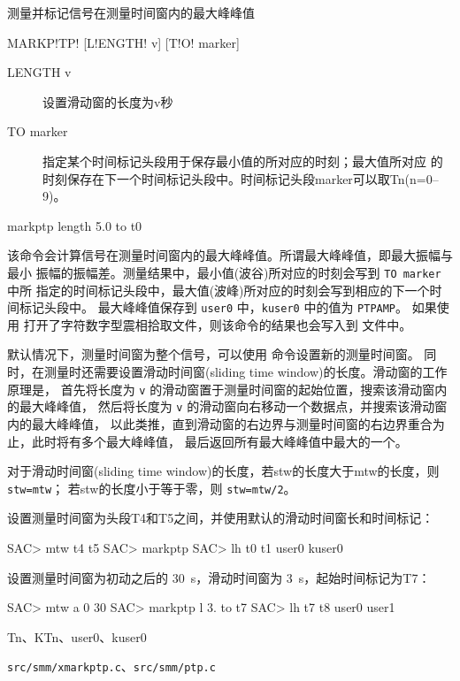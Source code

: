 \label{cmd:markptp}

测量并标记信号在测量时间窗内的最大峰峰值

\begin{SACSTX}
MARKP!TP! [L!ENGTH! v] [T!O! marker]
\end{SACSTX}

\begin{description}
\item [LENGTH v] 设置滑动窗的长度为v秒
\item [TO marker] 指定某个时间标记头段用于保存最小值的所对应的时刻；最大值所对应
    的时刻保存在下一个时间标记头段中。时间标记头段marker可以取Tn(n=0--9)。
\end{description}

\begin{SACDFT}
markptp length 5.0 to t0
\end{SACDFT}

该命令会计算信号在测量时间窗内的最大峰峰值。所谓最大峰峰值，即最大振幅与最小
振幅的振幅差。测量结果中，最小值(波谷)所对应的时刻会写到 \texttt{TO marker} 中所
指定的时间标记头段中，最大值(波峰)所对应的时刻会写到相应的下一个时间标记头段中。
最大峰峰值保存到 \texttt{user0} 中，\texttt{kuser0} 中的值为 \texttt{PTPAMP}。
如果使用  打开了字符数字型震相拾取文件，则该命令的结果也会写入到
文件中。

默认情况下，测量时间窗为整个信号，可以使用  命令设置新的测量时间窗。
同时，在测量时还需要设置滑动时间窗(sliding time window)的长度。滑动窗的工作原理是，
首先将长度为 \texttt{v} 的滑动窗置于测量时间窗的起始位置，搜索该滑动窗内的最大峰峰值，
然后将长度为 \texttt{v} 的滑动窗向右移动一个数据点，并搜索该滑动窗内的最大峰峰值，
以此类推，直到滑动窗的右边界与测量时间窗的右边界重合为止，此时将有多个最大峰峰值，
最后返回所有最大峰峰值中最大的一个。

对于滑动时间窗(sliding time window)的长度，若stw的长度大于mtw的长度，则 \texttt{stw=mtw}；
若stw的长度小于等于零，则 \texttt{stw=mtw/2}。

设置测量时间窗为头段T4和T5之间，并使用默认的滑动时间窗长和时间标记：
\begin{SACCode}
SAC> mtw t4 t5
SAC> markptp
SAC> lh t0 t1 user0 kuser0
\end{SACCode}

设置测量时间窗为初动之后的 \SI{30}{s}，滑动时间窗为 \SI{3}{s}，起始时间标记为T7：
\begin{SACCode}
SAC> mtw a 0 30
SAC> markptp l 3. to t7
SAC> lh t7 t8 user0 user1
\end{SACCode}

Tn、KTn、user0、kuser0

\texttt{src/smm/xmarkptp.c}、\texttt{src/smm/ptp.c}
